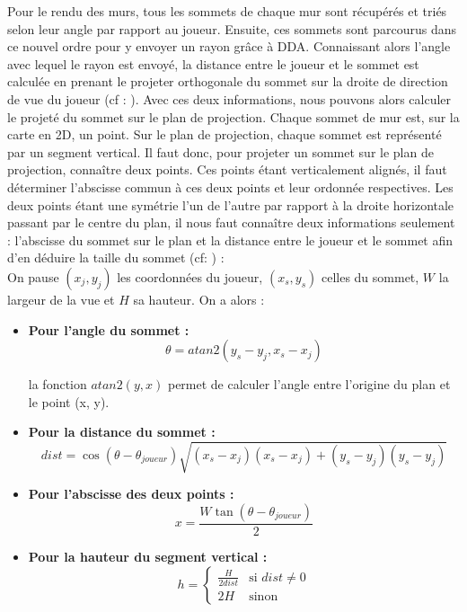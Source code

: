 \documentclass[11pt]{article}
\begin{document}
Pour le rendu des murs, tous les sommets de chaque mur sont récupérés et triés selon leur angle par rapport au joueur.
Ensuite, ces sommets sont parcourus dans ce nouvel ordre pour y envoyer un rayon grâce à DDA. Connaissant alors l'angle
avec lequel le rayon est envoyé, la distance entre le joueur et le sommet est calculée en prenant le projeter orthogonale
du sommet sur la droite de direction de vue du joueur (cf : ). Avec ces deux informations, nous pouvons alors calculer le projeté
du sommet sur le plan de projection. Chaque sommet de mur est, sur la carte en 2D, un point. Sur le plan de projection, 
chaque sommet est représenté par un segment vertical. Il faut donc, pour projeter un sommet sur le plan de projection, connaître
deux points. Ces points étant verticalement alignés, il faut déterminer l'abscisse commun à ces deux points et leur ordonnée 
respectives. Les deux points étant une symétrie l'un de l'autre par rapport à la droite horizontale passant par le centre du plan,
il nous faut connaître deux informations seulement : l'abscisse du sommet sur le plan et la distance entre le joueur et le sommet
afin d'en déduire la taille du sommet (cf: ) : \\

On pause $(x_j, y_j)$ les coordonnées du joueur,  $(x_s, y_s)$ celles du sommet, $W$ la largeur de la
vue et $H$ sa hauteur. On a alors : \\
\begin{itemize}
	\item[] \textbf{Pour l'angle du sommet : } \\
	\[
		\theta = atan2(y_s - y_j, x_s - x_j)
	\]

	la fonction $atan2(y, x)$ permet de calculer l'angle entre l'origine du plan et le point (x, y).

	\item[] \textbf{Pour la distance du sommet : } \\
	\[
		dist = \cos(\theta - \theta_{joueur})\sqrt{(x_s - x_j)(x_s - x_j) + (y_s - y_j)(y_s - y_j)}
	\]
	
	\item[] \textbf{Pour l'abscisse des deux points : } \\
	\[
		x = \frac{W\tan(\theta -  \theta_{joueur})}{2}
	\]

	\item[] \textbf{Pour la hauteur du segment vertical : } \\ 
	\[
		h = 
		\begin{cases}
			\frac{H}{2dist} & \text{si } dist \neq 0 \\
			2H & \text{sinon }
		\end{cases}
	\]
\end{itemize}
\end{document}
